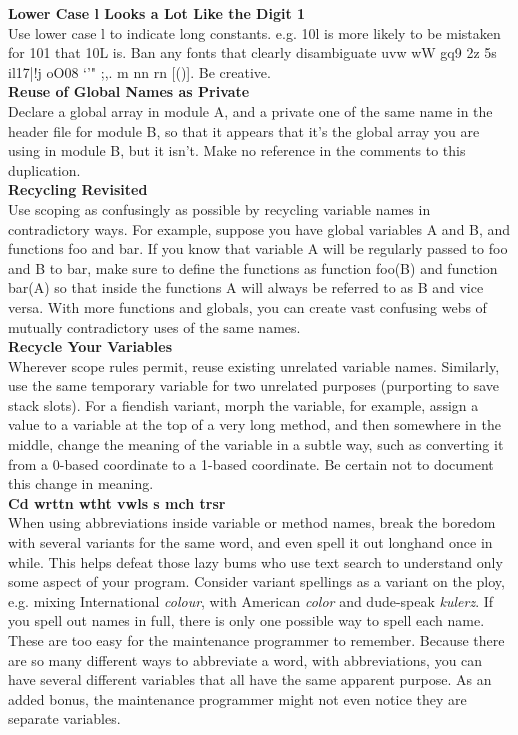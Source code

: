 \documentclass[11pt,twoside,a4paper]{article}
\begin{document}
\textbf{Lower Case l Looks a Lot Like the Digit 1}~\\
Use lower case l to indicate long constants. e.g. 10l is more likely to be mistaken for 101 that 10L is. Ban any fonts that clearly disambiguate uvw wW gq9 2z 5s il17|!j oO08 `'" ;,. m nn rn {[()]}. Be creative.~\\ 

\textbf{Reuse of Global Names as Private}~\\
Declare a global array in module A, and a private one of the same name in the header file for module B, so that it appears that it's the global array you are using in module B, but it isn't. Make no reference in the comments to this duplication.~\\ 

\textbf{Recycling Revisited}~\\
Use scoping as confusingly as possible by recycling variable names in contradictory ways. For example, suppose you have global variables A and B, and functions foo and bar. If you know that variable A will be regularly passed to foo and B to bar, make sure to define the functions as function foo(B) and function bar(A) so that inside the functions A will always be referred to as B and vice versa. With more functions and globals, you can create vast confusing webs of mutually contradictory uses of the same names.~\\ 

\textbf{Recycle Your Variables}~\\
Wherever scope rules permit, reuse existing unrelated variable names. Similarly, use the same temporary variable for two unrelated purposes (purporting to save stack slots). For a fiendish variant, morph the variable, for example, assign a value to a variable at the top of a very long method, and then somewhere in the middle, change the meaning of the variable in a subtle way, such as converting it from a 0-based coordinate to a 1-based coordinate. Be certain not to document this change in meaning.~\\ 

\textbf{Cd wrttn wtht vwls s mch trsr}~\\
When using abbreviations inside variable or method names, break the boredom with several variants for the same word, and even spell it out longhand once in while. This helps defeat those lazy bums who use text search to understand only some aspect of your program. Consider variant spellings as a variant on the ploy, e.g. mixing International \emph{colour}, with American \emph{color} and dude-speak \emph{kulerz}. If you spell out names in full, there is only one possible way to spell each name. These are too easy for the maintenance programmer to remember. Because there are so many different ways to abbreviate a word, with abbreviations, you can have several different variables that all have the same apparent purpose. As an added bonus, the maintenance programmer might not even notice they are separate variables.~\\ 
\end{document}
